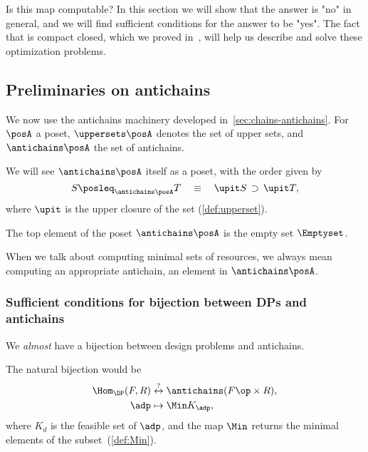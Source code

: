 Is this map computable?
In this section we will show that the answer is "no" in general, and we will find sufficient conditions for the answer to be "yes".
The fact that \DP is compact closed, which we proved in~\XXX, will help us describe and solve these optimization problems.

\subsection{Preliminaries on antichains}

We now use the antichains machinery developed in~\cref{sec:chains-antichains}.
For $\posA$ a poset, $\uppersets \posA$ denotes the set of upper sets, and $\antichains \posA$ the set of antichains.


We will see $\antichains \posA$ itself as a poset, with the order given by
\begin{equation}
    S \posleq_{\antichains \posA} T  \quad \equiv \quad\upit S\, \supset\,\upit T,
\end{equation}
where $\upit$ is the upper closure of the set (\cref{def:upperset}).

The top element of the poset $\antichains\posA$ is the empty set $\Emptyset$.

When we talk about computing minimal sets of resources, we always mean computing an appropriate antichain, \ie an element in $\antichains \posA$.

\subsubsection{Sufficient conditions for bijection between DPs and antichains}

We \emph{almost} have a bijection between design problems and antichains.

The natural bijection would be
\begin{equation}
    \begin{aligned}
        \Hom_\DP(F,R) & \overset{?
        }{\leftrightarrow} \antichains (F\op \times R), \\
        \adp          & \mapsto \Min K_\adp,
    \end{aligned}
\end{equation}
where $K_d$ is the feasible set of $\adp$,
and the map $\Min$ returns the minimal elements of the subset~(\cref{def:Min}).

